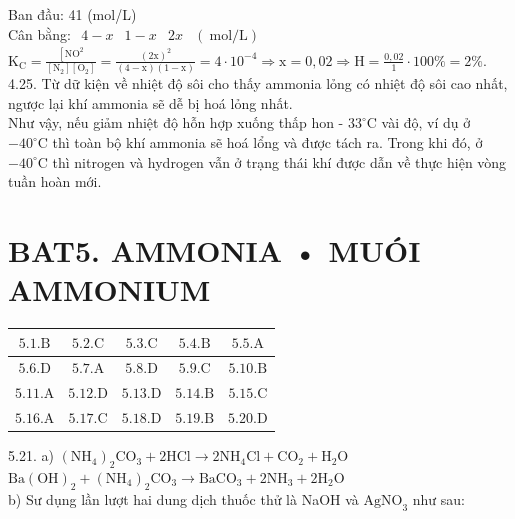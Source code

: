 \documentclass[10pt]{article}
\begin{document}
Ban đầu: 41 (mol/L)\\
Cân bằng: $\begin{array}{cccc}4-x & 1-x & 2 x & (\mathrm{~mol} / \mathrm{L})\end{array}$\\
$\mathrm{K}_{\mathrm{C}}=\frac{\left[\mathrm{NO}^{2}\right.}{\left[\mathrm{N}_{2}\right]\left[\mathrm{O}_{2}\right]}=\frac{(2 \mathrm{x})^{2}}{(4-\mathrm{x})(1-\mathrm{x})}=4 \cdot 10^{-4} \Rightarrow \mathrm{x}=0,02 \Rightarrow \mathrm{H}=\frac{0,02}{1} \cdot 100 \%=2 \%$.\\
4.25. Từ dữ kiện về nhiệt độ sôi cho thấy ammonia lỏng có nhiệt độ sôi cao nhất, ngược lại khí ammonia sẽ dễ bị hoá lỏng nhất.\\
Như vậy, nếu giảm nhiệt độ hỗn hợp xuống thấp hon - $33^{\circ} \mathrm{C}$ vài độ, ví dụ ở $-40^{\circ} \mathrm{C}$ thì toàn bộ khí ammonia sẽ hoá lổng và được tách ra. Trong khi đó, ở $-40^{\circ} \mathrm{C}$ thì nitrogen và hydrogen vẫn ở trạng thái khí được dẫn về thực hiện vòng tuần hoàn mới.

\section*{BAT5. AMMONIA • MUÓI AMMONIUM}
\begin{center}
\begin{tabular}{|c|c|c|c|c|}
\hline
$5.1 . \mathrm{B}$ & $5.2 . \mathrm{C}$ & $5.3 . \mathrm{C}$ & $5.4 . \mathrm{B}$ & $5.5 . \mathrm{A}$ \\
\hline
$5.6 . \mathrm{D}$ & $5.7 . \mathrm{A}$ & $5.8 . \mathrm{D}$ & $5.9 . \mathrm{C}$ & $5.10 . \mathrm{B}$ \\
\hline
$5.11 . \mathrm{A}$ & $5.12 . \mathrm{D}$ & $5.13 . \mathrm{D}$ & $5.14 . \mathrm{B}$ & $5.15 . \mathrm{C}$ \\
\hline
$5.16 . \mathrm{A}$ & $5.17 . \mathrm{C}$ & $5.18 . \mathrm{D}$ & $5.19 . \mathrm{B}$ & $5.20 . \mathrm{D}$ \\
\hline
\end{tabular}
\end{center}

5.21. a) $\left(\mathrm{NH}_{4}\right)_{2} \mathrm{CO}_{3}+2 \mathrm{HCl} \longrightarrow 2 \mathrm{NH}_{4} \mathrm{Cl}+\mathrm{CO}_{2}+\mathrm{H}_{2} \mathrm{O}$\\
$\mathrm{Ba}(\mathrm{OH})_{2}+\left(\mathrm{NH}_{4}\right)_{2} \mathrm{CO}_{3} \longrightarrow \mathrm{BaCO}_{3}+2 \mathrm{NH}_{3}+2 \mathrm{H}_{2} \mathrm{O}$\\
b) Sư dụng lần lượt hai dung dịch thuốc thử là NaOH và $\mathrm{AgNO}_{3}$ như sau:
\end{document}
